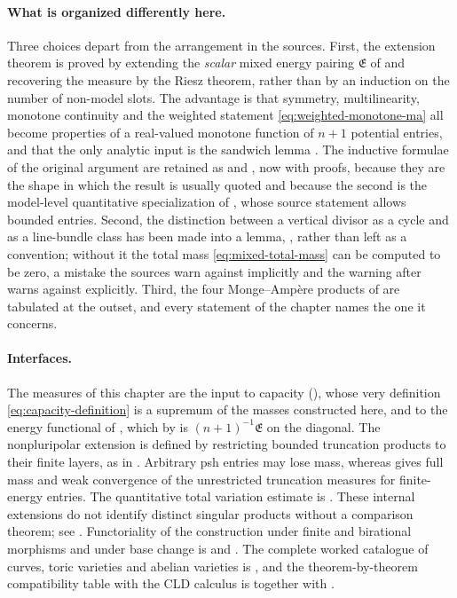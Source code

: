 \paragraph{What is organized differently here.}
Three choices depart from the arrangement in the sources.  First, the
extension theorem is proved by extending the \emph{scalar} mixed energy
pairing $\mathfrak E$ of  and recovering the
measure by the Riesz theorem, rather than by an induction on the number of
non-model slots.  The advantage is that symmetry, multilinearity, monotone
continuity and the weighted statement \eqref{eq:weighted-monotone-ma} all
become properties of a real-valued monotone function of $n+1$ potential
entries, and that
the only analytic input is the sandwich lemma
.  The inductive formulae of the original argument
are retained as  and
, now with proofs, because they are
the shape in which the result is usually quoted and because the second is the
model-level quantitative specialization of
\cite[Lemma~3.8]{BFJ15}, whose source statement allows bounded entries.  Second, the distinction
between a vertical divisor as a cycle and as a line-bundle class has been
made into a lemma, , rather than left as a
convention; without it the total mass \eqref{eq:mixed-total-mass} can be
computed to be zero, a mistake the sources warn against implicitly and the
warning after  warns against explicitly.
Third, the four Monge--Amp\`ere products of  are
tabulated at the outset, and every statement of the chapter names the one it
concerns.

\paragraph{Interfaces.}
The measures of this chapter are the input to capacity
(), whose very definition
\eqref{eq:capacity-definition} is a supremum of the masses constructed here,
and to the energy functional of , which by
 is $(n+1)^{-1}\mathfrak E$ on the diagonal.
The nonpluripolar extension is defined by restricting bounded truncation products to their finite layers, as in . Arbitrary psh entries may lose mass, whereas  gives full mass and weak convergence of the unrestricted truncation measures for finite-energy entries. The quantitative total variation estimate is . These internal extensions do not identify distinct singular products without a comparison theorem; see .  Functoriality of the construction under
finite and birational morphisms and under base change is
 and .  The complete
worked catalogue of curves, toric varieties and abelian varieties is
, and the theorem-by-theorem compatibility table
with the CLD calculus is  together with
.

